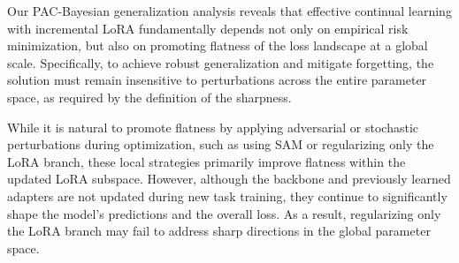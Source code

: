 \documentclass[letterpaper]{article} %
\begin{document}
Our PAC-Bayesian generalization analysis reveals that effective continual learning with incremental LoRA fundamentally depends not only on empirical risk minimization, but also on promoting flatness of the loss landscape at a global scale. Specifically, to achieve robust generalization and mitigate forgetting, the solution must remain insensitive to perturbations across the entire parameter space, as required by the definition of the sharpness.

While it is natural to promote flatness by applying adversarial or stochastic perturbations during optimization, such as using SAM or regularizing only the LoRA branch, these local strategies primarily improve flatness within the updated LoRA subspace. However, although the backbone and previously learned adapters are not updated during new task training, they continue to significantly shape the model’s predictions and the overall loss. As a result, regularizing only the LoRA branch may fail to address sharp directions in the global parameter space.







\end{document}
